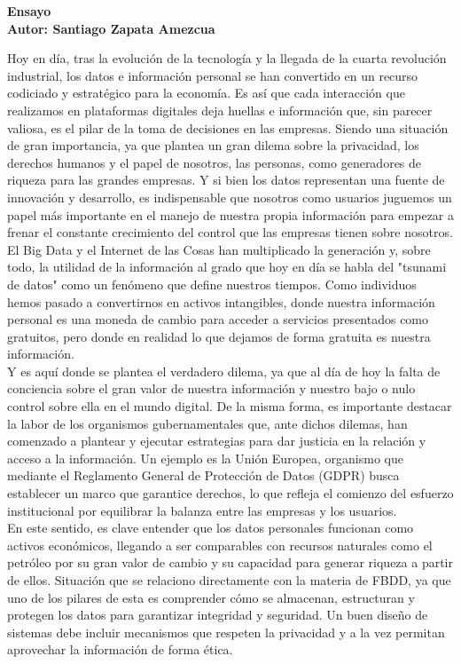 \documentclass[12pt]{report}
\begin{document}
\begin{enumerate}[label=\textbf{\arabic*.}, leftmargin=*]
\begin{enumerate}[label=\textbf{\alph*.}, leftmargin=*, itemsep=1.0em]
\newpage
\textbf{Ensayo\\
Autor: Santiago Zapata Amezcua}

Hoy en día, tras la evolución de la tecnología y la llegada de la cuarta revolución industrial, los datos e información personal se han convertido en un recurso codiciado y estratégico para la economía. Es así que cada interacción que realizamos en plataformas digitales deja huellas e información que, sin parecer valiosa, es el pilar de la toma de decisiones en las empresas. Siendo una situación de gran importancia, ya que plantea un gran dilema sobre la privacidad, los derechos humanos y el papel de nosotros, las personas, como generadores de riqueza para las grandes empresas. Y si bien los datos representan una fuente de innovación y desarrollo, es indispensable que nosotros como usuarios juguemos un papel más importante en el manejo de nuestra propia información para empezar a frenar el constante crecimiento del control que las empresas tienen sobre nosotros.\\

El Big Data y el Internet de las Cosas han multiplicado la generación y, sobre todo, la utilidad de la información al grado que hoy en día se habla del "tsunami de datos" como un fenómeno que define nuestros tiempos. Como individuos hemos pasado a convertirnos en activos intangibles, donde nuestra información personal es una moneda de cambio para acceder a servicios presentados como gratuitos, pero donde en realidad lo que dejamos de forma gratuita es nuestra información.\\

Y es aquí donde se plantea el verdadero dilema, ya que al día de hoy la falta de conciencia sobre el gran valor de nuestra información y nuestro bajo o nulo control sobre ella en el mundo digital. De la misma forma, es importante destacar la labor de los organismos gubernamentales que, ante dichos dilemas, han comenzado a plantear y ejecutar estrategias para dar justicia en la relación y acceso a la información. Un ejemplo es la Unión Europea, organismo que mediante el Reglamento General de Protección de Datos (GDPR) busca establecer un marco que garantice derechos, lo que refleja el comienzo del esfuerzo institucional por equilibrar la balanza entre las empresas y los usuarios.\\

En este sentido, es clave entender que los datos personales funcionan como activos económicos, llegando a ser comparables con recursos naturales como el petróleo por su gran valor de cambio y su capacidad para generar riqueza a partir de ellos. Situación que se relaciono directamente con la materia de FBDD, ya que uno de los pilares de esta es comprender cómo se almacenan, estructuran y protegen los datos para garantizar integridad y seguridad. Un buen diseño de sistemas debe incluir mecanismos que respeten la privacidad y a la vez permitan aprovechar la información de forma ética.\\


\end{enumerate}
\end{enumerate}
\end{document}
